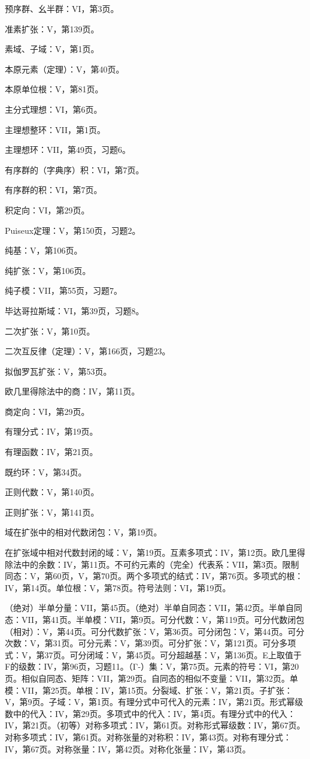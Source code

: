 预序群、幺半群：VI，第3页。

准素扩张：V，第139页。

素域、子域：V，第1页。

本原元素（定理）：V，第40页。

本原单位根：V，第81页。

主分式理想：VI，第6页。

主理想整环：VII，第1页。

主理想环：VII，第49页，习题6。

有序群的（字典序）积：VI，第7页。

有序群的积：VI，第7页。

积定向：VI，第29页。

Puiseux定理：V，第150页，习题2。

纯基：V，第106页。

纯扩张：V，第106页。

纯子模：VII，第55页，习题7。

毕达哥拉斯域：VI，第39页，习题8。

二次扩张：V，第10页。

二次互反律（定理）：V，第166页，习题23。

拟伽罗瓦扩张：V，第53页。

欧几里得除法中的商：IV，第11页。

商定向：VI，第29页。

有理分式：IV，第19页。

有理函数：IV，第21页。

既约环：V，第34页。

正则代数：V，第140页。

正则扩张：V，第141页。

域在扩张中的相对代数闭包：V，第19页。

在扩张域中相对代数封闭的域：V，第19页。互素多项式：IV，第12页。欧几里得除法中的余数：IV，第11页。不可约元素的（完全）代表系：VII，第3页。限制同态：V，第60页，V，第70页。两个多项式的结式：IV，第76页。多项式的根：IV，第14页。单位根：V，第78页。符号法则：VI，第19页。

（绝对）半单分量：VII，第45页。（绝对）半单自同态：VII，第42页。半单自同态：VII，第41页。半单模：VII，第9页。可分代数：V，第119页。可分代数闭包（相对）：V，第44页。可分代数扩张：V，第36页。可分闭包：V，第44页。可分次数：V，第31页。可分元素：V，第39页。可分扩张：V，第121页。可分多项式：V，第37页。可分闭域：V，第45页。可分超越基：V，第136页。E上取值于F的级数：IV，第96页，习题11。（Γ-）集：V，第75页。元素的符号：VI，第20页。相似自同态、矩阵：VII，第29页。自同态的相似不变量：VII，第32页。单模：VII，第25页。单根：IV，第15页。分裂域、扩张：V，第21页。子扩张：V，第9页。子域：V，第1页。有理分式中可代入的元素：IV，第21页。形式幂级数中的代入：IV，第29页。多项式中的代入：IV，第4页。有理分式中的代入：IV，第21页。（初等）对称多项式：IV，第61页。对称形式幂级数：IV，第67页。对称多项式：IV，第61页。对称张量的对称积：IV，第43页。对称有理分式：IV，第67页。对称张量：IV，第42页。对称化张量：IV，第43页。

